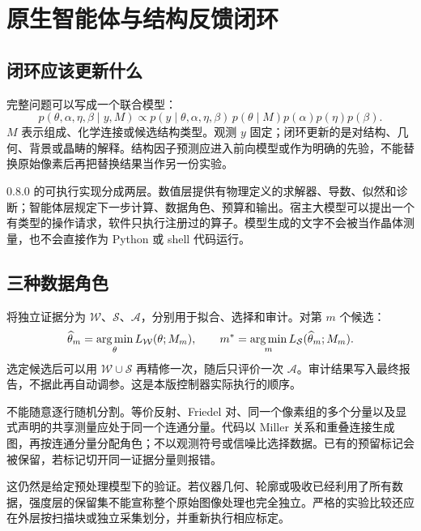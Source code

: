 \chapter{原生智能体与结构反馈闭环}\label{ch:loop}
\section{闭环应该更新什么}
完整问题可以写成一个联合模型：
\begin{equation}
 p(\theta,\alpha,\eta,\beta\mid y,M)
 \propto p(y\mid\theta,\alpha,\eta,\beta)\,
 p(\theta\mid M)p(\alpha)p(\eta)p(\beta).
\end{equation}
$M$ 表示组成、化学连接或候选结构类型。观测 $y$ 固定；闭环更新的是对结构、几何、背景或晶畴的解释。结构因子预测应进入前向模型或作为明确的先验，不能替换原始像素后再把替换结果当作另一份实验。

0.8.0 的可执行实现分成两层。数值层提供有物理定义的求解器、导数、似然和诊断；智能体层规定下一步计算、数据角色、预算和输出。宿主大模型可以提出一个有类型的操作请求，软件只执行注册过的算子。模型生成的文字不会被当作晶体测量，也不会直接作为 Python 或 shell 代码运行。

\section{三种数据角色}
将独立证据分为 $\mathcal W$、$\mathcal S$、$\mathcal A$，分别用于拟合、选择和审计。对第 $m$ 个候选：
\begin{equation}
 \widehat\theta_m=\operatorname*{arg\,min}_\theta L_{\mathcal W}(\theta;M_m),\qquad
 m^*=\operatorname*{arg\,min}_m L_{\mathcal S}(\widehat\theta_m;M_m).
\end{equation}
选定候选后可以用 $\mathcal W\cup\mathcal S$ 再精修一次，随后只评价一次 $\mathcal A$。审计结果写入最终报告，不据此再自动调参。这是本版控制器实际执行的顺序。

不能随意逐行随机分割。等价反射、Friedel 对、同一个像素组的多个分量以及显式声明的共享测量应处于同一个连通分量。代码以 Miller 关系和重叠连接生成图，再按连通分量分配角色；不以观测符号或信噪比选择数据。已有的预留标记会被保留，若标记切开同一证据分量则报错。

这仍然是给定预处理模型下的验证。若仪器几何、轮廓或吸收已经利用了所有数据，强度层的保留集不能宣称整个原始图像处理也完全独立。严格的实验比较还应在外层按扫描块或独立采集划分，并重新执行相应标定。

